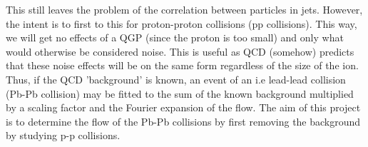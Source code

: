 \documentclass[a4, 12pt]{article}
\begin{document}
\indent This still leaves the problem of the correlation between particles in jets. However, the intent is to first to this for proton-proton collisions (pp collisions). This way, we will get no effects of a QGP (since the proton is too small) and only what would otherwise be considered noise. This is useful as QCD (somehow) predicts that these noise effects will be on the same form regardless of the size of the ion. Thus, if the QCD 'background' is known, an event of an i.e lead-lead collision (Pb-Pb collision) may be fitted to the sum of the known background multiplied by a scaling factor and the Fourier expansion of the flow. The aim of this project is to determine the flow of the Pb-Pb collisions by first removing the background by studying p-p collisions.
\end{document}
